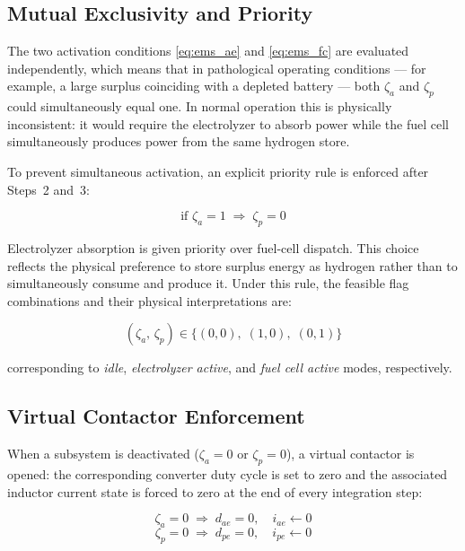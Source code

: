 \documentclass[journal]{IEEEtran}
\begin{document}
\subsection{Mutual Exclusivity and Priority}
\label{subsec:ems_mutex}

The two activation conditions \eqref{eq:ems_ae} and \eqref{eq:ems_fc} are
evaluated independently, which means that in pathological operating
conditions — for example, a large surplus coinciding with a depleted battery
— both $\zeta_a$ and $\zeta_p$ could simultaneously equal one. In normal
operation this is physically inconsistent: it would require the electrolyzer
to absorb power while the fuel cell simultaneously produces power from the
same hydrogen store.

To prevent simultaneous activation, an explicit priority rule is enforced
after Steps~2 and~3:

\begin{equation}
\text{if } \zeta_a = 1 \;\Rightarrow\; \zeta_p = 0
\label{eq:ems_priority}
\end{equation}

Electrolyzer absorption is given priority over fuel-cell dispatch. This
choice reflects the physical preference to store surplus energy as hydrogen
rather than to simultaneously consume and produce it. Under this rule, the
feasible flag combinations and their physical interpretations are:

\begin{equation}
(\zeta_a,\, \zeta_p) \in
\bigl\{(0,0),\;(1,0),\;(0,1)\bigr\}
\label{eq:ems_states}
\end{equation}

corresponding to \emph{idle}, \emph{electrolyzer active}, and
\emph{fuel cell active} modes, respectively.

\subsection{Virtual Contactor Enforcement}
\label{subsec:ems_contactor}

When a subsystem is deactivated ($\zeta_a = 0$ or $\zeta_p = 0$), a
virtual contactor is opened: the corresponding converter duty cycle is set
to zero and the associated inductor current state is forced to zero at the
end of every integration step:

\begin{equation}
\zeta_a = 0 \;\Rightarrow\; d_{ae} = 0,\quad i_{ae} \leftarrow 0
\label{eq:ems_contactor_ae}
\end{equation}
\begin{equation}
\zeta_p = 0 \;\Rightarrow\; d_{pe} = 0,\quad i_{pe} \leftarrow 0
\label{eq:ems_contactor_fc}
\end{equation}
\end{document}
